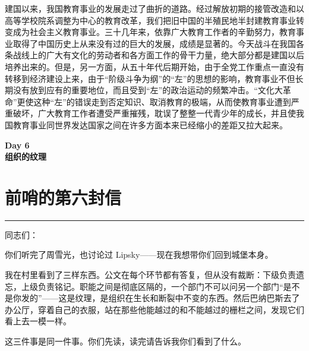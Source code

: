 \documentclass[12pt,a4paper]{article}
\begin{document}
建国以来，我国教育事业的发展走过了曲折的道路。经过解放初期的接管改造和以高等学校院系调整为中心的教育改革，我们把旧中国的半殖民地半封建教育事业转变成为社会主义教育事业。三十几年来，依靠广大教育工作者的辛勤努力，教育事业取得了中国历史上从来没有过的巨大的发展，成绩是显著的。今天战斗在我国各条战线上的广大有文化的劳动者和各方面工作的骨干力量，绝大部分都是建国以后培养出来的。但是，另一方面，从五十年代后期开始，由于全党工作重点一直没有转移到经济建设上来，由于“阶级斗争为纲”的“左”的思想的影响，教育事业不但长期没有放到应有的重要地位，而且受到“左”的政治运动的频繁冲击。“文化大革命”更使这种“左”的错误走到否定知识、取消教育的极端，从而使教育事业遭到严重破坏，广大教育工作者遭受严重摧残，耽误了整整一代青少年的成长，并且使我国教育事业同世界发达国家之间在许多方面本来已经缩小的差距又拉大起来。
\newpage
\begin{center}
{\LARGE \bfseries Day 6\\[1em]组织的纹理}
\end{center}
\vspace{3em}
\section{前哨的第六封信}
\vspace{0.5em}
\vspace{0.3em}

\noindent\rule{\textwidth}{0.4pt}

\vspace{0.3em}



同志们：



你们听完了周雪光，也讨论过 Lipsky——现在我想带你们回到城堡本身。



我在村里看到了三样东西。公文在每个环节都有答复，但从没有裁断：下级负责遗忘，上级负责铭记。职能之间是彻底区隔的，一个部门不可以问另一个部门“是不是你发的”——这是纹理，是组织在生长和断裂中不变的东西。然后巴纳巴斯去了办公厅，穿着自己的衣服，站在那些他能越过的和不能越过的栅栏之间，发现它们看上去一模一样。



这三件事是同一件事。你们先读，读完请告诉我你们看到了什么。
\end{document}
